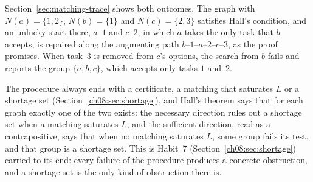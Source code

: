 Section~\ref{sec:matching-trace} shows both outcomes. The graph with $N(a)=\{1,2\}$, $N(b)=\{1\}$ and $N(c)=\{2,3\}$ satisfies Hall's condition, and an unlucky start there, $a$--$1$ and $c$--$2$, in which $a$ takes the only task that $b$ accepts, is repaired along the augmenting path $b$--$1$--$a$--$2$--$c$--$3$, as the proof promises. When task~$3$ is removed from $c$'s options, the search from $b$ fails and reports the group $\{a,b,c\}$, which accepts only tasks $1$ and~$2$.

The procedure always ends with a certificate, a matching that saturates $L$ or a shortage set (Section~\ref{ch08:sec:shortage}), and Hall's theorem says that for each graph exactly one of the two exists: the necessary direction rules out a shortage set when a matching saturates $L$, and the sufficient direction, read as a contrapositive, says that when no matching saturates $L$, some group fails its test, and that group is a shortage set. This is Habit~7 (Section~\ref{ch08:sec:shortage}) carried to its end: every failure of the procedure produces a concrete obstruction, and a shortage set is the only kind of obstruction there is.
